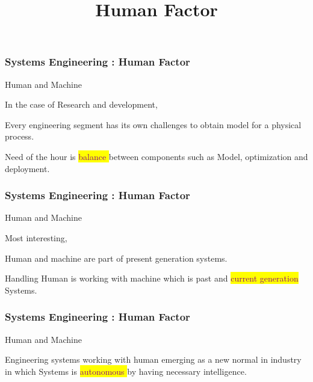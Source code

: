 
\title[Systems Engineering]{Human Factor} 


\begin{frame}
\frametitle{Systems Engineering : Human Factor }
\begin{block}{Human and Machine}

In the case of Research and development, 

Every engineering segment has its own challenges to obtain model for a physical process. 

 Need of the hour is  \colorbox{yellow}{ \textcolor{purple}{balance } }    between components such as Model, optimization and deployment. 

\end{block}
\end{frame}


\newpage 
 

\begin{frame}
\frametitle{Systems Engineering : Human Factor }
\begin{block}{Human and Machine}

  Most interesting, 
  
  Human and machine are part of present generation systems.
  
 Handling Human is working with machine which is past and 
 \colorbox{yellow}{ \textcolor{purple}{current generation } }   Systems.

\end{block}
\end{frame}


\newpage 
 

\begin{frame}
\frametitle{Systems Engineering : Human Factor }
\begin{block}{Human and Machine}

Engineering systems working with human emerging as a new normal in industry in which Systems is   \colorbox{yellow}{ \textcolor{purple}{ autonomous} }    by having necessary intelligence.

\end{block}
\end{frame}

